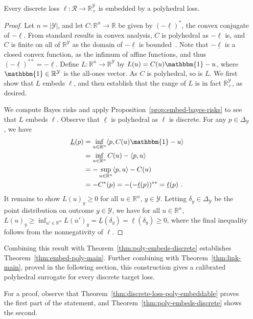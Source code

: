 \documentclass[twoside,11pt]{article}
\newcommand{\reals}{\mathbb{R}}
\newcommand{\simplex}{\Delta_\Y}
\newcommand{\R}{\mathcal{R}}
\newcommand{\Y}{\mathcal{Y}}
\newcommand{\risk}[1]{\underline{#1}}
\newcommand{\inprod}[2]{\langle #1, #2 \rangle}%
\newcommand{\ones}{\mathbbm{1}}
\begin{document}
\begin{theorem}\label{thm:discrete-loss-poly-embeddable}
  Every discrete loss $\ell:\R \to \reals^\Y_+$ is embedded by a polyhedral loss.
\end{theorem}
\begin{proof}
  Let $n = |\Y|$, and let $C:\reals^n \to \reals$ be given by $(-\risk{\ell})^*$, the convex conjugate of $-\risk{\ell}$.
  From standard results in convex analysis, $C$ is polyhedral as $-\risk{\ell}$ is, and $C$ is finite on all of $\reals^\Y$ as the domain of $-\risk{\ell}$ is bounded~\cite[Corollary 13.3.1]{rockafellar1997convex}.
  Note that $-\risk{\ell}$ is a closed convex function, as the infimum of affine functions, and thus $(-\risk{\ell})^{**} = -\risk{\ell}$.
  Define $L:\reals^n\to\reals^\Y$ by $L(u) = C(u)\ones - u$, where $\ones\in\reals^\Y$ is the all-ones vector.
  As $C$ is polyhedral, so is $L$.
  We first show that $L$ embeds $\ell$, and then establish that the range of $L$ is in fact $\reals^\Y_+$, as desired.

  We compute Bayes risks and apply Proposition~\ref{prop:embed-bayes-risks} to see that $L$ embeds $\ell$.
  Observe that $\risk{\ell}$ is polyhedral as $\ell$ is discrete.
  For any $p\in\simplex$, we have
  \begin{align*}
    \risk{L}(p)
    &= \inf_{u\in\reals^n} \inprod{p}{C(u)\ones - u}\\
    &= \inf_{u\in\reals^n} C(u) - \inprod{p}{u}\\
    &= -\sup_{u\in\reals^n} \inprod{p}{u} - C(u)\\
    &= -C^*(p) = - (-\risk{\ell}(p))^{**} = \risk{\ell}(p)~.
  \end{align*}
  It remains to show $L(u)_y \geq 0$ for all $u\in\reals^n$, $y\in\Y$.
  Letting $\delta_y\in\simplex$ be the point distribution on outcome $y\in\Y$, we have for all $u\in\reals^n$, $L(u)_y \geq \inf_{u'\in\reals^n} L(u')_y = \risk{L}(\delta_y) = \risk{\ell}(\delta_y) \geq 0$, where the final inequality follows from the nonnegativity of $\ell$.
\end{proof}

Combining this result with Theorem~\ref{thm:poly-embeds-discrete} establishes Theorem~\ref{thm:embed-poly-main}.
Further combining with Theorem~\ref{thm:link-main}, proved in the following section, this construction gives a calibrated polyhedral surrogate for every discrete target loss.

\embedpolyinformal*
For a proof, observe that Theorem~\ref{thm:discrete-loss-poly-embeddable} proves the first part of the statement, and Theorem~\ref{thm:poly-embeds-discrete} shows the second.
\end{document}
